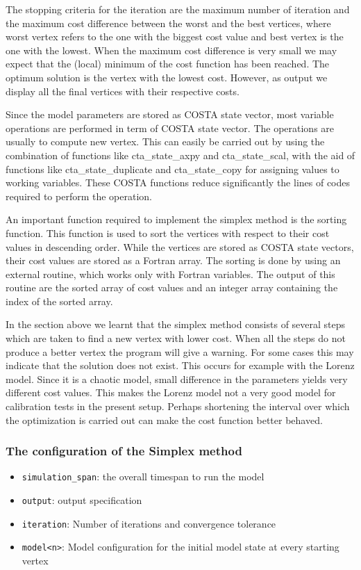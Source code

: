 \documentclass[a4paper,12pt]{article}
\begin{document}
The stopping criteria for the iteration are the maximum number of iteration
and the maximum cost difference between the worst and the best vertices,
where worst vertex refers to the one with the biggest cost value and best
vertex is the one with the lowest. When the maximum cost difference is very
small we may expect that the (local) minimum of the cost function has been
reached. The optimum solution is the vertex with the lowest cost. However,
as output we display all the final vertices with their respective costs.

Since the model parameters are stored as COSTA state vector, most variable
operations are performed in term of COSTA state vector. The operations are
usually to compute new vertex. This can easily be carried out by using the
combination of functions like cta\_state\_axpy and cta\_state\_scal, with
the aid of functions like cta\_state\_duplicate and cta\_state\_copy for
assigning values to working variables. These COSTA functions reduce
significantly the lines of codes required to perform the operation.

An important function required to implement the simplex method is the sorting
function. This function is used to sort the vertices with respect to their
cost values in descending order. While the vertices are stored as COSTA
state vectors, their cost values are stored as a Fortran array. The sorting
is done by using an external routine, which works only with Fortran
variables. The output of this routine are the sorted array of cost values
and an integer array containing the index of the sorted array.

In the section above  we learnt that the simplex method consists
of several steps which are taken to find a new vertex with lower cost. When
all the steps do not produce a better vertex the program will give a
warning. For some cases this may indicate that the solution does not exist.
This occurs for example with the Lorenz model. Since it is a chaotic model,
small difference in the parameters yields very different cost values. This
makes the Lorenz model not a very good model for calibration tests in the
present setup. Perhaps shortening the interval over which the optimization
is carried out can make the cost function better behaved.
\subsubsection{The configuration of the Simplex method}
\begin{itemize}
\item {\tt simulation\_span}: the overall timespan to run the model
\item {\tt output}: output specification
\item {\tt iteration}: Number of iterations and convergence tolerance
\item {\tt model<n>}: Model configuration for the initial model state at every
starting vertex
\end{itemize}
\end{document}
